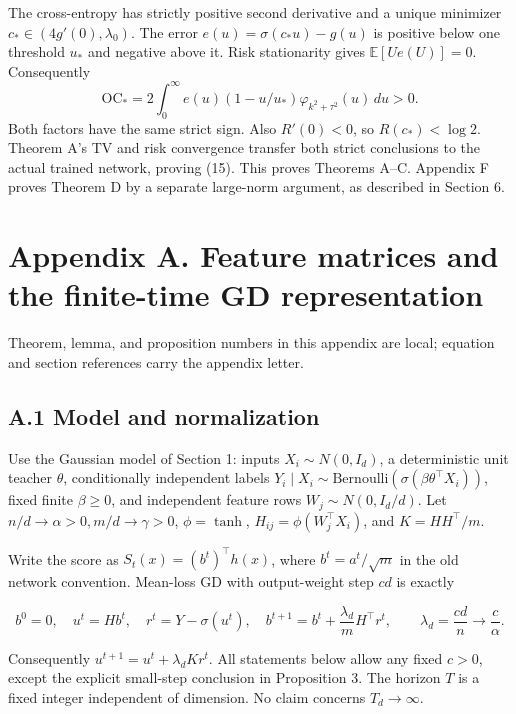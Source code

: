 \documentclass[
  11pt,
  a4paper,
]{article}
\begin{document}
The cross-entropy has strictly positive second derivative and a unique
minimizer \(c_*\in(4g'(0),\lambda_0)\). The error
\(e(u)=\sigma(c_*u)-g(u)\) is positive below one threshold \(u_*\) and
negative above it. Risk stationarity gives \(\mathbb E[Ue(U)]=0\).
Consequently \[
\mathrm{OC}_*=2\int_0^\infty e(u)(1-u/u_*)\varphi_{k^2+\tau^2}(u)\,du>0.
\] Both factors have the same strict sign. Also \(R'(0)<0\), so
\(R(c_*)<\log2\). Theorem A's TV and risk convergence transfer both
strict conclusions to the actual trained network, proving (15). This
proves Theorems A--C. Appendix F proves Theorem D by a separate
large-norm argument, as described in Section 6.

\clearpage

\hypertarget{appendix-a.-feature-matrices-and-the-finite-time-gd-representation}{%
\section{Appendix A. Feature matrices and the finite-time GD
representation}\label{appendix-a.-feature-matrices-and-the-finite-time-gd-representation}}

Theorem, lemma, and proposition numbers in this appendix are local;
equation and section references carry the appendix letter.

\hypertarget{a.1-model-and-normalization}{%
\subsection{A.1 Model and
normalization}\label{a.1-model-and-normalization}}

Use the Gaussian model of Section 1: inputs \(X_i\sim N(0,I_d)\), a
deterministic unit teacher \(\theta\), conditionally independent labels
\(Y_i\mid X_i\sim\mathrm{Bernoulli}(\sigma(\beta\theta^\top X_i))\),
fixed finite \(\beta\ge0\), and independent feature rows
\(W_j\sim N(0,I_d/d)\). Let \(n/d\to\alpha>0,m/d\to\gamma>0\),
\(\phi=\tanh\), \(H_{ij}=\phi(W_j^\top X_i)\), and \(K=HH^\top/m\).

Write the score as \(S_t(x)=(b^t)^\top h(x)\), where \(b^t=a^t/\sqrt m\)
in the old network convention. Mean-loss GD with output-weight step
\(cd\) is exactly

\[
b^0=0,\quad u^t=Hb^t,\quad r^t=Y-\sigma(u^t),\quad
b^{t+1}=b^t+\frac{\lambda_d}{m}H^\top r^t,
\qquad\lambda_d=\frac{cd}{n}\longrightarrow\frac c\alpha. \tag{A.1.1}
\]

Consequently \(u^{t+1}=u^t+\lambda_dKr^t\). All statements below allow
any fixed \(c>0\), except the explicit small-step conclusion in
Proposition 3. The horizon \(T\) is a fixed integer independent of
dimension. No claim concerns \(T_d\to\infty\).
\end{document}
